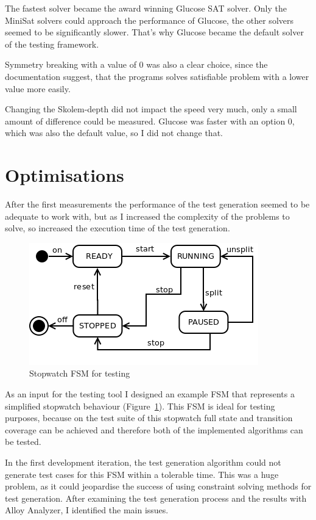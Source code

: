 The fastest solver became the award winning Glucose SAT solver. Only the MiniSat solvers could approach the performance of Glucose, the other solvers seemed to be significantly slower. That's why Glucose became the default solver of the testing framework.

Symmetry breaking with a value of 0 was also a clear choice, since the documentation suggest, that the programs solves satisfiable problem with a lower value more easily. 

Changing the Skolem-depth did not impact the speed very much, only a small amount of difference could be measured. Glucose was faster with an option 0, which was also the default value, so I did not change that.


\section{Optimisations}
\label{sec:optimalisations}

After the first measurements the performance of the test generation seemed to be adequate to work with, but as I increased the complexity of the problems to solve, so increased the execution time of the test generation. 

\begin{figure}[htp]
\centering
\includegraphics[scale=0.5]{figures/measurements_stopwatch}
\caption{Stopwatch FSM for testing}
\label{fig:measurements_stopwatch}
\end{figure}

As an input for the testing tool I designed an example FSM that represents a simplified stopwatch behaviour (Figure~\ref{fig:measurements_stopwatch}). This FSM is ideal for testing purposes, because on the test suite of this stopwatch full state and transition coverage can be achieved and therefore both of the implemented algorithms can be tested.

In the first development iteration, the test generation algorithm could not generate test cases for this FSM within a tolerable time. This was a huge problem, as it could jeopardise the success of using constraint solving methods for test generation. After examining the test generation process and the results with Alloy Analyzer, I identified the main issues.

